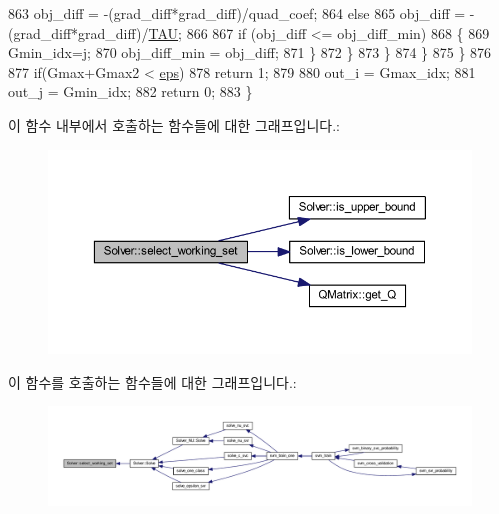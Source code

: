 \begin{DoxyCode}
863                         obj\_diff = -(grad\_diff*grad\_diff)/quad\_coef;
864                     \textcolor{keywordflow}{else}
865                         obj\_diff = -(grad\_diff*grad\_diff)/\hyperlink{svm_8cpp_a3d8c9c145887af5174ba4cc6789862ad}{TAU};
866 
867                     \textcolor{keywordflow}{if} (obj\_diff <= obj\_diff\_min)
868                     \{
869                         Gmin\_idx=j;
870                         obj\_diff\_min = obj\_diff;
871                     \}
872                 \}
873             \}
874         \}
875     \}
876 
877     \textcolor{keywordflow}{if}(Gmax+Gmax2 < \hyperlink{class_solver_a718333cc2c1d40abf9c292a788cba1e5}{eps})
878         \textcolor{keywordflow}{return} 1;
879 
880     out\_i = Gmax\_idx;
881     out\_j = Gmin\_idx;
882     \textcolor{keywordflow}{return} 0;
883 \}
\end{DoxyCode}


이 함수 내부에서 호출하는 함수들에 대한 그래프입니다.\+:
\nopagebreak
\begin{figure}[H]
\begin{center}
\leavevmode
\includegraphics[width=350pt]{class_solver_a95fb4eaf33362558e1fc768f4db019d3_cgraph}
\end{center}
\end{figure}




이 함수를 호출하는 함수들에 대한 그래프입니다.\+:
\nopagebreak
\begin{figure}[H]
\begin{center}
\leavevmode
\includegraphics[width=350pt]{class_solver_a95fb4eaf33362558e1fc768f4db019d3_icgraph}
\end{center}
\end{figure}


